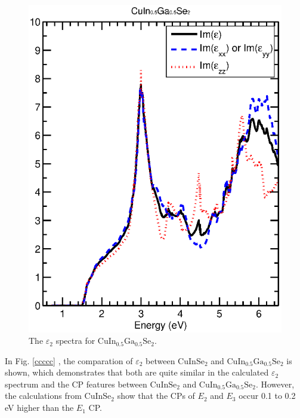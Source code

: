 \documentclass[a4paper, 12pt, titlepage,oneside,drop]{kthesis}
\begin{document}
\begin{figure}[H]
\begin{center}
\includegraphics[scale=0.7]{thesis1.eps}
\end{center}
\caption{The $\varepsilon_2$ spectra for $\mathrm {CuIn_{0.5}Ga_{0.5}Se_2}$. }
\end{figure}

In Fig. \ref{ccccc} , the comparation of $\varepsilon_2$ between ${\mathrm{ CuInSe_2}}$ and $\mathrm {CuIn_{0.5}Ga_{0.5}Se_2}$  is shown, which demonstrates that both are quite similar in 
the calculated $\varepsilon_2$ spectrum and the CP features between ${\mathrm{ CuInSe_2}}$ and $\mathrm {CuIn_{0.5}Ga_{0.5}Se_2}$. However, the calculations from 
${\mathrm{ CuInSe_2}}$ show that the CPs of $E_2$ and $E_3$ occur 0.1 to 0.2 eV higher than the $E_1$ CP.
\end{document}

